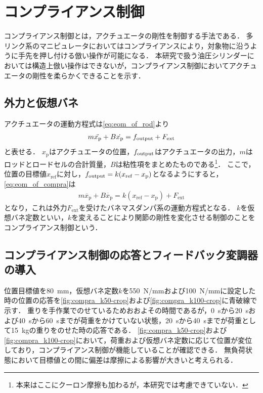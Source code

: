 \clearpage
\section{コンプライアンス制御}
コンプライアンス制御とは，アクチュエータの剛性を制御する手法である\cite{松野_大須賀_松原_野田_稲見201712,吉川198811,谷江和雄1989コンプライアンス制御と柔軟接触問題}．
多リンク系のマニピュレータにおいてはコンプライアンスにより，対象物に沿うように手先を押し付ける倣い操作が可能になる．
本研究で扱う油圧シリンダーにおいては構造上倣い操作はできないが，コンプライアンス制御においてアクチュエータの剛性を柔らかくできることを示す．
\subsection{外力と仮想バネ}
アクチュエータの運動方程式は\eqnname\eqref{eq:eom_of_rod}より
\begin{align}
    \label{eq:eom_of_compra}
    m\ddot{x_\mathrm{p}} + B\dot{x_\mathrm{p}} = f_\mathrm{output} +F_\mathrm{ext}
\end{align}
と表せる．
$x_\mathrm{p}$はアクチュエータの位置，$f_\mathrm{output}$はアクチュエータの出力，$m$はロッドとロードセルの合計質量，$B$は粘性項をまとめたものである\footnote{本来はここにクーロン摩擦も加わるが，本研究では考慮できていない．}．
ここで，位置の目標値$x_\mathrm{ref}$に対し，$f_\mathrm{output} = k(x_\mathrm{ref}-x_\mathrm{p})$となるようにすると，\eqnname\eqref{eq:eom_of_compra}は
\begin{align}
    \label{eq:hoge}
    m\ddot{x_\mathrm{p}} + B\dot{x_\mathrm{p}} = k(x_\mathrm{ref}-x_\mathrm{p}) +F_\mathrm{ext}
\end{align}
となり，これは外力$F_\mathrm{ext}$を受けたバネマスダンパ系の運動方程式となる．
$k$を仮想バネ定数といい，$k$を変えることにより関節の剛性を変化させる制御のことをコンプライアンス制御という．

\subsection{コンプライアンス制御の応答とフィードバック変調器の導入}
位置目標値を\SI{80}{mm}，仮想バネ定数$k$を5\SI{50}{N/mm}および\SI{100}{N/mm}に設定した時の位置の応答を\figname\ref{fig:compra_k50-crop}および\figname\ref{fig:compra_k100-crop}に青破線で示す．
重りを手作業でのせているためおおよその時間であるが，\SI{0}{s}から\SI{20}{s}および\SI{40}{s}から\SI{60}{s}までが荷重をかけていない状態，\SI{20}{s}から\SI{40}{s}までが荷重として\SI{15}{kg}の重りをのせた時の応答である．
\figname\ref{fig:compra_k50-crop}および\figname\ref{fig:compra_k100-crop}において，荷重および仮想バネ定数に応じて位置が変位しており，コンプライアンス制御が機能していることが確認できる．
無負荷状態において目標値との間に偏差は摩擦による影響が大きいと考えられる．

